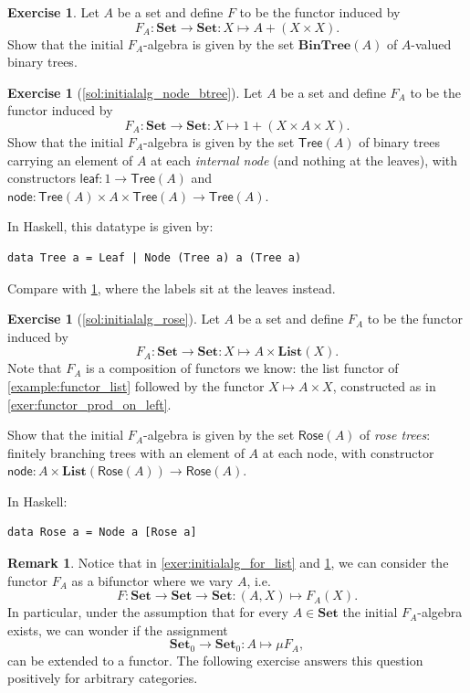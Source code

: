 \documentclass[a4paper,11pt, oneside,titlepage=false]{scrbook}
\theoremstyle{plain}
\theoremstyle{definition}
\newtheorem{rem}[thm]{Remark}
\newtheorem{exer}[thm]{Exercise}
\newcommand{\Catb}[1]{\mathbf{#1}}
\newcommand{\List}{\Catb{List}}
\newcommand{\BinTree}{\Catb{BinTree}}
\newcommand{\SET}{\Catb{Set}}
\newcommand{\Ob}[1]{{#1}_0}
\begin{document}
\begin{exer}\label{exer:initialalg_for_btree} Let $A$ be a set and define $F$ to be the functor induced by
\[
F_A:\SET\to\SET : X\mapsto A + (X\times X).
\]
Show that the initial $F_A$-algebra is given by the set $\BinTree(A)$ of $A$-valued binary trees.
\end{exer}

\begin{exer}[\cref{sol:initialalg_node_btree}]\label{exer:initialalg_node_btree}
  Let $A$ be a set and define $F_A$ to be the functor induced by
  \[
  F_A : \SET \to \SET : X \mapsto 1 + (X \times A \times X).
  \]
  Show that the initial $F_A$-algebra is given by the set $\mathsf{Tree}(A)$ of
  binary trees carrying an element of $A$ at each \emph{internal node} (and
  nothing at the leaves), with constructors
  $\mathsf{leaf} : 1 \to \mathsf{Tree}(A)$ and
  $\mathsf{node} : \mathsf{Tree}(A) \times A \times \mathsf{Tree}(A) \to \mathsf{Tree}(A)$.

  In Haskell, this datatype is given by:
\begin{lstlisting}
data Tree a = Leaf | Node (Tree a) a (Tree a)
\end{lstlisting}
  Compare with \cref{exer:initialalg_for_btree}, where the labels sit at the
  leaves instead.
\end{exer}

\begin{exer}[\cref{sol:initialalg_rose}]\label{exer:initialalg_rose}
  Let $A$ be a set and define $F_A$ to be the functor induced by
  \[
  F_A : \SET \to \SET : X \mapsto A \times \List(X).
  \]
  Note that $F_A$ is a composition of functors we know: the list functor of
  \cref{example:functor_list} followed by the functor $X \mapsto A \times X$,
  constructed as in \cref{exer:functor_prod_on_left}.

  Show that the initial $F_A$-algebra is given by the set $\mathsf{Rose}(A)$ of
  \emph{rose trees}: finitely branching trees with an element of $A$ at each
  node, with constructor
  $\mathsf{node} : A \times \List(\mathsf{Rose}(A)) \to \mathsf{Rose}(A)$.

  In Haskell:
\begin{lstlisting}
data Rose a = Node a [Rose a]
\end{lstlisting}
\end{exer}

\begin{rem} Notice that in \cref{exer:initialalg_for_list} and \cref{exer:initialalg_for_btree}, we can consider the functor $F_A$ as a bifunctor where we vary $A$, i.e.
\[
F: \SET\to \SET\to \SET: (A,X)\mapsto F_A(X).
\]
In particular, under the assumption that for every $A\in\SET$ the initial $F_A$-algebra exists, we can wonder if the assignment
\[
\Ob{\SET} \to \Ob{\SET} : A\mapsto \mu F_A ,
\]
can be extended to a functor. The following exercise answers this question positively for arbitrary categories.
\end{rem}
\end{document}
